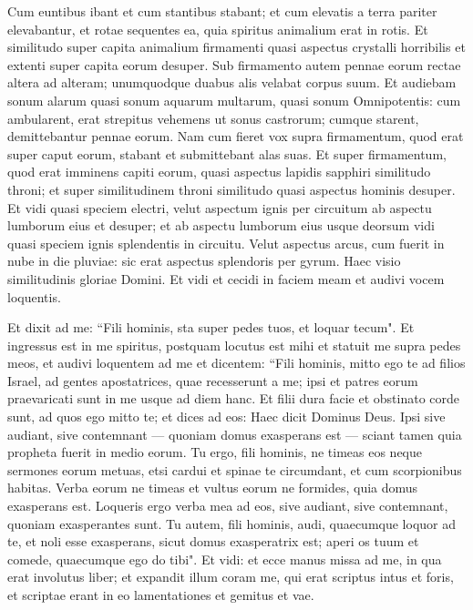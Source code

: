 \begin{biblechapter}
\verse Cum euntibus ibant et cum stantibus stabant; et cum elevatis a terra pariter elevabantur, et rotae sequentes ea, quia spiritus animalium erat in rotis. 
\verse Et similitudo super capita animalium firmamenti quasi aspectus crystalli horribilis et extenti super capita eorum desuper. 
\verse Sub firmamento autem pennae eorum rectae altera ad alteram; unumquodque duabus alis velabat corpus suum. 
\verse Et audiebam sonum alarum quasi sonum aquarum multarum, quasi sonum Omnipotentis: cum ambularent, erat strepitus vehemens ut sonus castrorum; cumque starent, demittebantur pennae eorum. 
\verse Nam cum fieret vox supra firmamentum, quod erat super caput eorum, stabant et submittebant alas suas. 
\verse Et super firmamentum, quod erat imminens capiti eorum, quasi aspectus lapidis sapphiri similitudo throni; et super similitudinem throni similitudo quasi aspectus hominis desuper. 
\verse Et vidi quasi speciem electri, velut aspectum ignis per circuitum ab aspectu lumborum eius et desuper; et ab aspectu lumborum eius usque deorsum vidi quasi speciem ignis splendentis in circuitu. 
\verse Velut aspectus arcus, cum fuerit in nube in die pluviae: sic erat aspectus splendoris per gyrum. Haec visio similitudinis gloriae Domini. Et vidi et cecidi in faciem meam et audivi vocem loquentis. 
\end{biblechapter}

\begin{biblechapter}  
\verse Et dixit ad me: “Fili hominis, sta super pedes tuos, et loquar tecum".  
\verse Et ingressus est in me spiritus, postquam locutus est mihi et statuit me supra pedes meos, et audivi loquentem ad me 
\verse et dicentem: “Fili hominis, mitto ego te ad filios Israel, ad gentes apostatrices, quae recesserunt a me; ipsi et patres eorum praevaricati sunt in me usque ad diem hanc. 
\verse Et filii dura facie et obstinato corde sunt, ad quos ego mitto te; et dices ad eos: Haec dicit Dominus Deus. 
\verse Ipsi sive audiant, sive contemnant — quoniam domus exasperans est — sciant tamen quia propheta fuerit in medio eorum. 
\verse Tu ergo, fili hominis, ne timeas eos neque sermones eorum metuas, etsi cardui et spinae te circumdant, et cum scorpionibus habitas. Verba eorum ne timeas et vultus eorum ne formides, quia domus exasperans est. 
\verse Loqueris ergo verba mea ad eos, sive audiant, sive contemnant, quoniam exasperantes sunt. 
\verse Tu autem, fili hominis, audi, quaecumque loquor ad te, et noli esse exasperans, sicut domus exasperatrix est; aperi os tuum et comede, quaecumque ego do tibi". 
\verse Et vidi: et ecce manus missa ad me, in qua erat involutus liber; et expandit illum coram me, qui erat scriptus intus et foris, et scriptae erant in eo lamentationes et gemitus et vae. 
\end{biblechapter}

